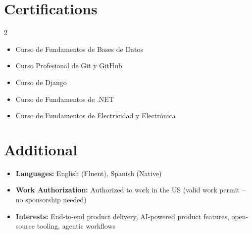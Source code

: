 \documentclass[letterpaper,11pt]{article}
\begin{document}
\section{Certifications}
\begin{multicols}{2}
\begin{itemize}[leftmargin=0.15in, label={\small{}}, itemsep=-2pt]
    \small
    \item Curso de Fundamentos de Bases de Datos
    \item Curso Profesional de Git y GitHub
    \item Curso de Django
    \item Curso de Fundamentos de .NET
    \item Curso de Fundamentos de Electricidad y Electr\'{o}nica
\end{itemize}
\end{multicols}

\section{Additional}
\begin{itemize}[leftmargin=0.15in, label={}, itemsep=-2pt]
    \small
    \item \textbf{Languages:} English (Fluent), Spanish (Native)
    \item \textbf{Work Authorization:} Authorized to work in the US (valid work permit -- no sponsorship needed)
    \item \textbf{Interests:} End-to-end product delivery, AI-powered product features, open-source tooling, agentic workflows
\end{itemize}
\end{document}

